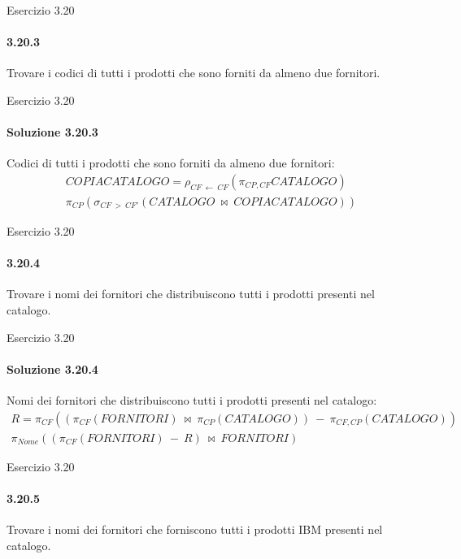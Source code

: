 %
\begin{frame}{Esercizio 3.20}
    \framesubtitle{3.20.3}
    \vspace{-3.cm}
    \vspace{.3cm}

    Trovare i codici di tutti i prodotti che sono forniti da almeno due fornitori.
\end{frame}
%
\begin{frame}{Esercizio 3.20}
    \framesubtitle{Soluzione 3.20.3}
    \vspace*{-2cm}
    \vspace{.3cm}

    {\small Codici di tutti i prodotti che sono forniti da almeno due fornitori:}
    \small
    \begin{gather*}
        COPIACATALOGO = \rho_{CF~\leftarrow~CF} (\pi_{CP,CF} CATALOGO)\\
        \pi_{CP} (\sigma_{CF~>~CF'} (CATALOGO~\bowtie~COPIACATALOGO))
    \end{gather*}
\end{frame}
%
\begin{frame}{Esercizio 3.20}
    \framesubtitle{3.20.4}
    \vspace{-3.cm}
    \vspace{.3cm}

    Trovare i nomi dei fornitori che distribuiscono tutti i prodotti presenti nel catalogo.
\end{frame}
%
\begin{frame}{Esercizio 3.20}
    \framesubtitle{Soluzione 3.20.4}
    \vspace*{-2cm}
    \vspace{.3cm}

    {\small Nomi dei fornitori che distribuiscono tutti i prodotti presenti nel catalogo:}
    \small
    \begin{gather*}
        R = \pi_{CF}((\pi_{CF} (FORNITORI)~\bowtie~\pi_{CP}(CATALOGO))~-~\pi_{CF,CP}(CATALOGO))\\
        \pi_{Nome}((\pi_{CF}(FORNITORI)~-~R)~\bowtie~FORNITORI)
    \end{gather*}
\end{frame}
%
\begin{frame}{Esercizio 3.20}
    \framesubtitle{3.20.5}
    \vspace{-3.cm}
    \vspace{.3cm}

    Trovare i nomi dei fornitori che forniscono tutti i prodotti IBM presenti nel catalogo.
\end{frame}
